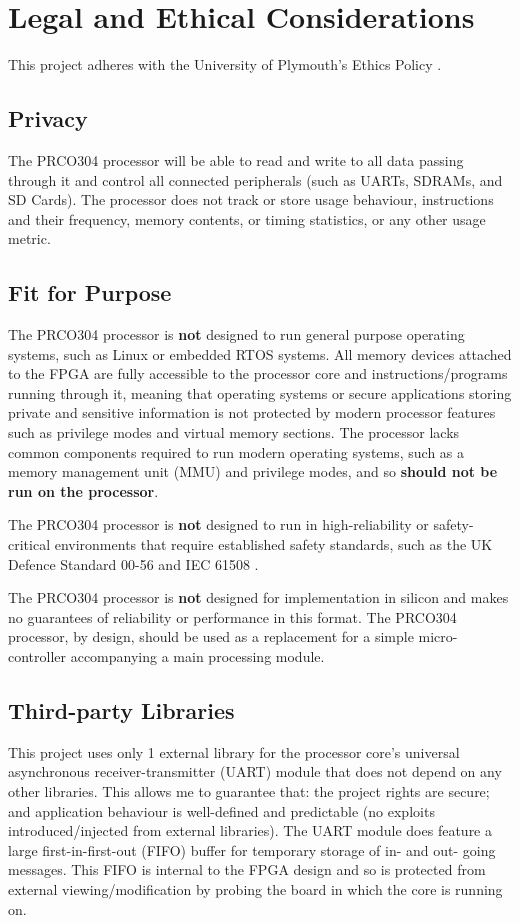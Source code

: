 \documentclass[11pt,a4paper]{report}
\newcommand{\scname}{PRCO304}
\begin{document}
\section{Legal and Ethical Considerations}
This project adheres with the University of Plymouth's Ethics Policy \cite{ethics}.

\subsection{Privacy}
The \scname{} processor will be able to read and write to all data passing through it and control all connected peripherals (such as UARTs, SDRAMs, and SD Cards). The processor does not track or store usage behaviour, instructions and their frequency,   memory contents, or timing statistics, or any other usage metric.

\subsection{Fit for Purpose}
The \scname{} processor is \textbf{not} designed to run general purpose operating systems, such as Linux or embedded RTOS systems. All memory devices attached to the FPGA are fully accessible to the processor core and instructions/programs running through it, meaning that operating systems or secure applications storing private and sensitive information is not protected by modern processor features such as privilege modes and virtual memory sections. The processor lacks common components required to run modern operating systems, such as a memory management unit (MMU) and privilege modes, and so \textbf{should not be run on the processor}.

The \scname{} processor is \textbf{not} designed to run in high-reliability or safety-critical environments that require established safety standards, such as the UK Defence Standard 00-56 \cite{defstan_0056_2} and IEC 61508 \cite{iec61508}.

The \scname{} processor is \textbf{not} designed for implementation in silicon and makes no guarantees of reliability or performance in this format. The \scname{} processor, by design, should be used as a replacement for a simple micro-controller accompanying a main processing module.

\subsection{Third-party Libraries}
This project uses only 1 external library for the processor core's universal asynchronous receiver-transmitter (UART) module that does not depend on any other libraries. This allows me to guarantee that: the project rights are secure; and application behaviour is well-defined and predictable (no exploits introduced/injected from external libraries). The UART module does feature a large first-in-first-out (FIFO) buffer for temporary storage of in- and out- going messages. This FIFO is internal to the FPGA design and so is protected from external viewing/modification by probing the board in which the core is running on.
\end{document}
